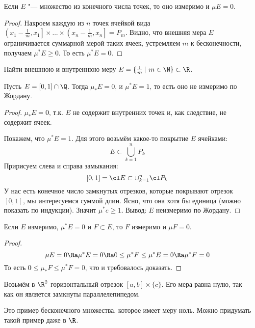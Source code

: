 \begin{exmp}
	Если $E$ "--- множество из конечного числа точек, то оно измеримо и $\mu E = 0$.
\end{exmp}
\begin{proof}
	Накроем каждую из $n$ точек ячейкой вида $\left(x_1 - \frac 1m, x_1\right] \times\dots\times \left(x_n - \frac 1m, x_n\right] = P_m$.
	Видно, что внешняя мера $E$ ограничивается суммарной мерой таких ячеек, устремляем $m$ к бесконечности, получаем $\mu^* E \ge 0$.
	То есть $\mu^* E = 0$.
\end{proof}

\begin{Exercise}
	Найти внешнюю и внутреннюю меру $E = \{ \frac 1 m \mid m \in \N \} \subset \R$.
\end{Exercise}

\begin{exmp}
	Пусть $E = [0, 1] \cap \Q$.
	Тогда $\mu_* E = 0$, и $\mu^* E = 1$, то есть оно не измеримо по Жордану.
\end{exmp}
\begin{proof}
	$\mu_* E = 0$, т.к. $E$ не содержит внутренних точек и, как следствие, не содержит ячеек.

	Покажем, что $\mu^* E = 1$.
	Для этого возьмём какое-то покрытие $E$ ячейками:
	\[ E \subset \bigcup_{k=1}^n P_k \]
	Пририсуем слева и справа замыкания:
	\[ [0,1] = \cl E \subset \cup_{k=1}^n \cl P_k \]
	У нас есть конечное число замкнутых отрезков, которые покрывают отрезок $[0,1]$, мы интересуемся
	суммой длин.
	Ясно, что она хотя бы единица (можно показать по индукции).
	Значит $\mu^*e \ge 1$.
	Вывод: $E$ неизмеримо по Жордану.
\end{proof}

\begin{exmp}
	Если $E$ измеримо, $\mu^* E = 0$ и $F \subset E$, то $F$ измеримо и $\mu F = 0$.
\end{exmp}
\begin{proof}
	\[ \mu E = 0 \Ra \mu^* E = 0 \Ra 0 \le \mu^* F \le \mu^* E = 0 \Ra \mu^*F = 0 \]
	То есть $0 \le \mu_* F \le \mu^* F = 0$, что и требовалось доказать.
\end{proof}

\begin{exmp}
	Возьмём в $\R^2$ горизонтальный отрезок $[a,b] \times \{c\}$.
	Его мера равна нулю, так как он является замкнуты параллелепипедом.
\end{exmp}
\begin{Rem}
	Это пример бесконечного множества, которое имеет меру ноль.
	Можно придумать такой пример даже в $\R$.
\end{Rem}

